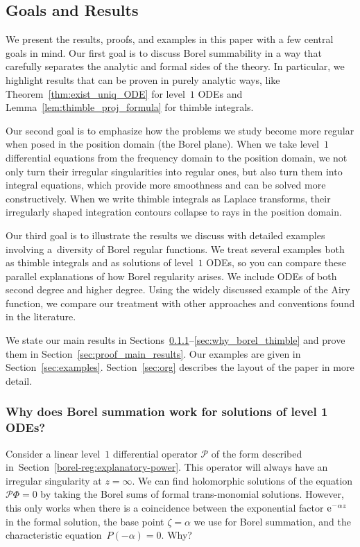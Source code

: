 \documentclass[10pt,a4paper]{amsart}
\numberwithin{equation}{section}
\begin{document}
\subsection{Goals and Results}
%
We present the results, proofs, and examples in this paper with a few central goals in mind. Our first goal is to discuss Borel summability in a way that carefully separates the analytic and formal sides of the theory. In particular, we highlight results that can be proven in purely analytic ways, like Theorem~\ref{thm:exist_uniq_ODE} for level~$1$ ODEs and Lemma~\ref{lem:thimble_proj_formula} for thimble integrals.

Our second goal is to emphasize how the problems we study become more regular when posed in the position domain (the Borel plane). When we take level~$1$ differential equations from the frequency domain to the position domain, we not only turn their irregular singularities into regular ones, but also turn them into integral equations, which provide more smoothness and can be solved more constructively. When we write thimble integrals as Laplace transforms, their irregularly shaped integration contours collapse to rays in the position domain.

Our third goal is to illustrate the results we discuss with detailed examples involving a~diversity of Borel regular functions. We treat several examples both as thimble integrals and as solutions of level~$1$ ODEs, so you can compare these parallel explanations of how Borel regularity arises. We include ODEs of both second degree and higher degree. Using the widely discussed example of the Airy function, we compare our treatment with other approaches and conventions found in the literature.

We state our main results in Sections~\ref{sec:why_borel_ODE}--\ref{sec:why_borel_thimble} and prove them in Section~\ref{sec:proof_main_results}. Our examples are given in Section~\ref{sec:examples}. Section~\ref{sec:org} describes the layout of the paper in more detail.
%
\subsubsection[Why does Borel summation work for solutions of level 1 ODEs?]{Why does Borel summation work for solutions of level 1 ODEs?}\label{sec:why_borel_ODE}

Consider a linear level~$1$ differential operator $\mathcal{P}$ of the form described in~Section~\ref{borel-reg:explanatory-power}. This operator will always have an irregular singularity at $z = \infty$. We can find holomorphic solutions of the equation $\mathcal{P}\Phi = 0$ by taking the Borel sums of formal trans-monomial solutions. However, this only works when there is a coincidence between the exponential factor ${\rm e}^{-\alpha z}$ in the formal solution, the base point $\zeta = \alpha$ we use for Borel summation, and the characteristic equation~${P(-\alpha) = 0}$. Why?
\end{document}
